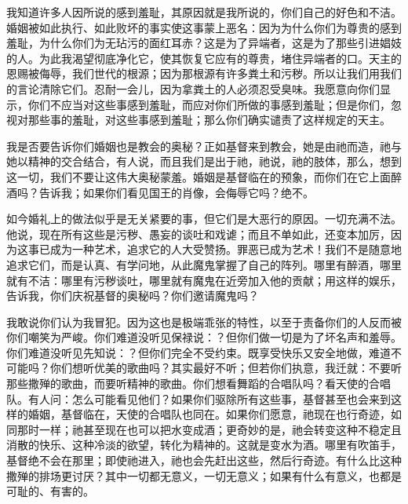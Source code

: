 我知道许多人因所说的感到羞耻，其原因就是我所说的，你们自己的好色和不洁。婚姻被如此执行、如此败坏的事实使这事蒙上恶名：因为为什么你们为尊贵的感到羞耻，为什么你们为无玷污的面红耳赤？这是为了异端者，这是为了那些引进娼妓的人。为此我渴望彻底净化它，使其恢复它应有的尊贵，堵住异端者的口。天主的恩赐被侮辱，我们世代的根源；因为那根源有许多粪土和污秽。所以让我们用我们的言论清除它们。忍耐一会儿，因为拿粪土的人必须忍受臭味。我愿意向你们显示，你们不应当对这些事感到羞耻，而应对你们所做的事感到羞耻；但是你们，忽视对那些事的羞耻，对这些事感到羞耻；那么你们确实谴责了这样规定的天主。\par

我是否要告诉你们婚姻也是教会的奥秘？正如基督来到教会，她是由祂而造，祂与她以精神的交合结合，有人说，而且我们是出于祂，祂说，祂的肢体，那么，想到这一切，我们不要让这伟大奥秘蒙羞。婚姻是基督临在的预象，而你们在它上面醉酒吗？告诉我；如果你们看见国王的肖像，会侮辱它吗？绝不。\par

如今婚礼上的做法似乎是无关紧要的事，但它们是大恶行的原因。一切充满不法。他说，现在所有这些是污秽、愚妄的谈吐和戏谑；而且不单如此，还变本加厉，因为这事已成为一种艺术，追求它的人大受赞扬。罪恶已成为艺术！我们不是随意地追求它们，而是认真、有学问地，从此魔鬼掌握了自己的阵列。哪里有醉酒，哪里就有不洁：哪里有污秽谈吐，哪里就有魔鬼在近旁加入他的贡献；用这样的娱乐，告诉我，你们庆祝基督的奥秘吗？你们邀请魔鬼吗？\par

我敢说你们认为我冒犯。因为这也是极端乖张的特性，以至于责备你们的人反而被你们嘲笑为严峻。你们难道没听见保禄说：？但你们做一切是为了坏名声和羞辱。你们难道没听见先知说：？但你们完全不受约束。既享受快乐又安全地做，难道不可能吗？你们想听优美的歌曲吗？其实最好不听；但若你们执意，我迁就：不要听那些撒殚的歌曲，而要听精神的歌曲。你们想看舞蹈的合唱队吗？看天使的合唱队。有人问：怎么可能看见他们？如果你们驱除所有这些事，基督甚至也会来到这样的婚姻，基督临在，天使的合唱队也同在。如果你们愿意，祂现在也行奇迹，如同那时一样；祂甚至现在也可以把水变成酒；更奇妙的是，祂会转变这种不稳定且消散的快乐、这种冷淡的欲望，转化为精神的。这就是变水为酒。哪里有吹笛手，基督绝不会在那里；即使祂进入，祂也会先赶出这些，然后行奇迹。有什么比这种撒殚的排场更讨厌？其中一切都无意义，一切无意义；如果有什么有意义，也都是可耻的、有害的。\par

